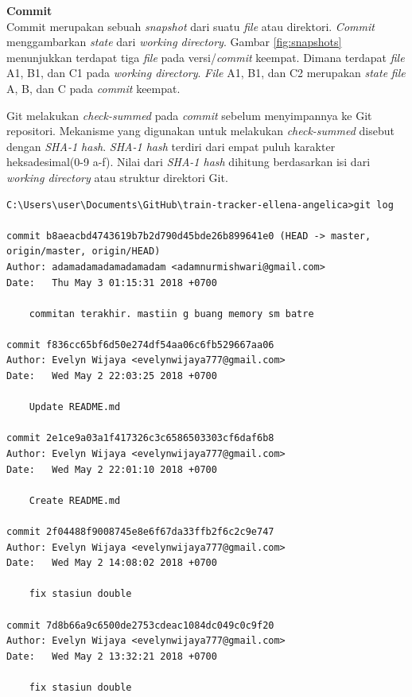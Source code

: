\documentclass[a4paper,twoside]{article}
\begin{document}
\begin{enumerate}
\textbf{Commit}\\
Commit merupakan sebuah \textit{snapshot} dari suatu \textit{file} atau direktori. \textit{Commit} menggambarkan \textit{state} dari \textit{working directory}. Gambar \ref{fig:snapshots} menunjukkan terdapat tiga \textit{file} pada versi/\textit{commit} keempat. Dimana terdapat \textit{file} A1, B1, dan C1 pada \textit{working directory}. \textit{File} A1, B1, dan C2  merupakan \textit{state} \textit{file} A, B, dan C pada \textit{commit} keempat. 

Git melakukan \textit{check-summed} pada \textit{commit} sebelum menyimpannya ke Git repositori. Mekanisme yang digunakan untuk melakukan \textit{check-summed} disebut dengan \textit{SHA-1 hash}. \textit{SHA-1 hash} terdiri dari empat puluh karakter heksadesimal(0-9 a-f). Nilai dari \textit{SHA-1 hash} dihitung berdasarkan isi dari \textit{working directory} atau struktur direktori Git.


\begin{lstlisting}[caption={Contoh histori commit dalam pengembangan perangkat lunak},label={lst:git_histori},language=plaintext]
C:\Users\user\Documents\GitHub\train-tracker-ellena-angelica>git log

commit b8aeacbd4743619b7b2d790d45bde26b899641e0 (HEAD -> master, origin/master, origin/HEAD)
Author: adamadamadamadamadam <adamnurmishwari@gmail.com>
Date:   Thu May 3 01:15:31 2018 +0700

    commitan terakhir. mastiin g buang memory sm batre

commit f836cc65bf6d50e274df54aa06c6fb529667aa06
Author: Evelyn Wijaya <evelynwijaya777@gmail.com>
Date:   Wed May 2 22:03:25 2018 +0700

    Update README.md

commit 2e1ce9a03a1f417326c3c6586503303cf6daf6b8
Author: Evelyn Wijaya <evelynwijaya777@gmail.com>
Date:   Wed May 2 22:01:10 2018 +0700

    Create README.md

commit 2f04488f9008745e8e6f67da33ffb2f6c2c9e747
Author: Evelyn Wijaya <evelynwijaya777@gmail.com>
Date:   Wed May 2 14:08:02 2018 +0700

    fix stasiun double

commit 7d8b66a9c6500de2753cdeac1084dc049c0c9f20
Author: Evelyn Wijaya <evelynwijaya777@gmail.com>
Date:   Wed May 2 13:32:21 2018 +0700

    fix stasiun double
    
\end{lstlisting}


\end{enumerate}
\end{document}
